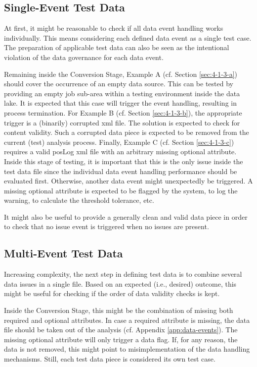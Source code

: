 \subsection{Single-Event Test Data} \label{sec:4-single-event}
At first, it might be reasonable to check if all data event handling works individually. This means considering each defined data event as a single test case. The preparation of applicable test data can also be seen as the intentional violation of the data governance for each data event.

Remaining inside the Conversion Stage, Example A (cf. Section \ref{sec:4-1-3-a}) should cover the occurrence of an empty data source. This can be tested by providing an empty job sub-area within a testing environment inside the data lake. It is expected that this case will trigger the event handling, resulting in process termination. For Example B (cf. Section \ref{sec:4-1-3-b}), the appropriate trigger is a (binarily) corrupted \ac{xml} file. The solution is expected to check for content validity. Such a corrupted data piece is expected to be removed from the current (test) analysis process. Finally, Example C (cf. Section \ref{sec:4-1-3-c}) requires a valid \ac{pos}Log \ac{xml} file with an arbitrary missing optional attribute. Inside this stage of testing, it is important that this is the only issue inside the test data file since the individual data event handling performance should be evaluated first. Otherwise, another data event might unexpectedly be triggered. A missing optional attribute is expected to be flagged by the system, to log the warning, to calculate the threshold tolerance, etc.

It might also be useful to provide a generally clean and valid data piece in order to check that no issue event is triggered when no issues are present.

\subsection{Multi-Event Test Data} \label{sec:4-multi-event}
Increasing complexity, the next step in defining test data is to combine several data issues in a single file. Based on an expected (i.e., desired) outcome, this might be useful for checking if the order of data validity checks is kept.

Inside the Conversion Stage, this might be the combination of missing both required and optional attributes. In case a required attribute is missing, the data file should be taken out of the analysis (cf. Appendix \ref{app:data-events}). The missing optional attribute will only trigger a data flag. If, for any reason, the data is not removed, this might point to misimplementation of the data handling mechanisms. Still, each test data piece is considered its own test case.

